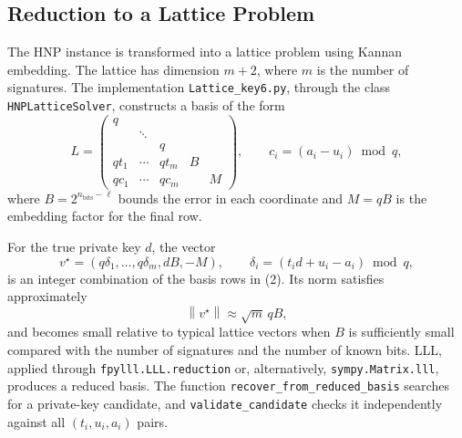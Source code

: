\documentclass[11pt,a4paper]{article}
\newcommand{\norm}[1]{\left\lVert #1\right\rVert}
\begin{document}
\subsection{Reduction to a Lattice Problem}

The HNP instance is transformed into a lattice problem using Kannan embedding. The lattice has dimension $m+2$, where $m$ is the number of signatures. The implementation \texttt{Lattice\_key6.py}, through the class \texttt{HNPLatticeSolver}, constructs a basis of the form
\[
L=
\begin{pmatrix}
q & & & &\\
&\ddots&&&\\
&&q&&\\
qt_1&\cdots&qt_m&B&\\
qc_1&\cdots&qc_m&&M
\end{pmatrix},
\qquad
c_i=(a_i-u_i)\bmod q,
\tag{2}
\]
where $B=2^{n_{\mathrm{bits}}-\ell}$ bounds the error in each coordinate and $M=qB$ is the embedding factor for the final row.

For the true private key $d$, the vector
\[
v^\star=
(q\delta_1,\ldots,q\delta_m,dB,-M),
\qquad
\delta_i=(t_i d+u_i-a_i)\bmod q,
\]
is an integer combination of the basis rows in (2). Its norm satisfies approximately
\[
\norm{v^\star}\approx \sqrt{m}\,qB,
\]
and becomes small relative to typical lattice vectors when $B$ is sufficiently small compared with the number of signatures and the number of known bits. LLL, applied through \texttt{fpylll.LLL.reduction} or, alternatively, \texttt{sympy.Matrix.lll}, produces a reduced basis. The function \texttt{recover\_from\_reduced\_basis} searches for a private-key candidate, and \texttt{validate\_candidate} checks it independently against all $(t_i,u_i,a_i)$ pairs.

\begin{figure}[H]
\centering
{}
\end{figure}
\end{document}
